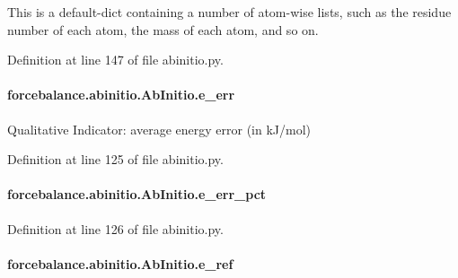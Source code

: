 This is a default-\/dict containing a number of atom-\/wise lists, such as the residue number of each atom, the mass of each atom, and so on. 



Definition at line 147 of file abinitio.\-py.

\hypertarget{classforcebalance_1_1abinitio_1_1AbInitio_aa569290969858e189935b3de37ead3f0}{
\paragraph[{e\-\_\-err}]{\setlength{\rightskip}{0pt plus 5cm}forcebalance.\-abinitio.\-Ab\-Initio.\-e\-\_\-err\hspace{0.3cm}{\ttfamily [inherited]}}}\label{classforcebalance_1_1abinitio_1_1AbInitio_aa569290969858e189935b3de37ead3f0}


Qualitative Indicator\-: average energy error (in k\-J/mol) 



Definition at line 125 of file abinitio.\-py.

\hypertarget{classforcebalance_1_1abinitio_1_1AbInitio_a4e3e525a03ab55bc004ebf0e3a0d60ce}{
\paragraph[{e\-\_\-err\-\_\-pct}]{\setlength{\rightskip}{0pt plus 5cm}forcebalance.\-abinitio.\-Ab\-Initio.\-e\-\_\-err\-\_\-pct\hspace{0.3cm}{\ttfamily [inherited]}}}\label{classforcebalance_1_1abinitio_1_1AbInitio_a4e3e525a03ab55bc004ebf0e3a0d60ce}


Definition at line 126 of file abinitio.\-py.

\hypertarget{classforcebalance_1_1abinitio_1_1AbInitio_a71d13d3fabd98146c68bb5fc784f6732}{
\paragraph[{e\-\_\-ref}]{\setlength{\rightskip}{0pt plus 5cm}forcebalance.\-abinitio.\-Ab\-Initio.\-e\-\_\-ref\hspace{0.3cm}{\ttfamily [inherited]}}}\label{classforcebalance_1_1abinitio_1_1AbInitio_a71d13d3fabd98146c68bb5fc784f6732}



